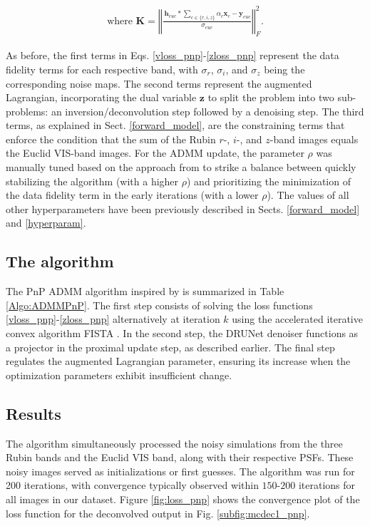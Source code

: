 \documentclass[traditabstract]{aa}
\begin{document}
\begin{appendix}
\begin{align}
\text{where } \textbf{K} = \left\Vert \frac{\hspace{2pt} \mathbf{h}_{euc} \ast \sum\limits_{c\in\{r,i,z\}} \alpha_c \mathbf{x}_c - \mathbf{y}_{euc} }{\sigma_{euc}} \right\Vert_F^2. \label{eq:constr_pnp}
\end{align}

\noindent As before, the first terms in Eqs. \ref{vloss_pnp}-\ref{zloss_pnp} represent the data fidelity terms for each respective band, with $\sigma_r$, $\sigma_i$, and $\sigma_z$ being the corresponding noise maps. The second terms represent the augmented Lagrangian, incorporating the dual variable $\mathbf{z}$ to split the problem into two sub-problems: an inversion/deconvolution step followed by a denoising step. The third terms, as explained in Sect. \ref{forward_model}, are the constraining terms that enforce the condition that the sum of the Rubin $r$-, $i$-, and $z$-band images equals the Euclid VIS-band images. For the ADMM update, the parameter $\rho$ was manually tuned based on the approach from \cite{sureau2020} to strike a balance between quickly stabilizing the algorithm (with a higher $\rho$) and prioritizing the minimization of the data fidelity term in the early iterations (with a lower $\rho$). The values of all other hyperparameters have been previously described in Sects. \ref{forward_model} and \ref{hyperparam}.


\subsection{The algorithm}
\label{pnp_admm_algo}

The PnP ADMM algorithm inspired by \cite{sureau2020} is summarized in Table \ref{Algo:ADMMPnP}. The first step consists of solving the loss functions \ref{vloss_pnp}-\ref{zloss_pnp} alternatively at iteration $k$ using the accelerated iterative convex algorithm FISTA \citep{Beck2009}. In the second step, the DRUNet denoiser functions as a projector in the proximal update step, as described earlier. The final step regulates the augmented Lagrangian parameter, ensuring its increase when the optimization parameters exhibit insufficient change.

\subsection{Results}
\label{pnp_admm_results}

The algorithm simultaneously processed the noisy simulations from the three Rubin bands and the Euclid VIS band, along with their respective PSFs. These noisy images served as initializations or first guesses. The algorithm was run for 200 iterations, with convergence typically observed within $150$-$200$ iterations for all images in our dataset. Figure \ref{fig:loss_pnp} shows the convergence plot of the loss function for the deconvolved output in Fig. \ref{subfig:mcdec1_pnp}.


\end{appendix}
\end{document}
